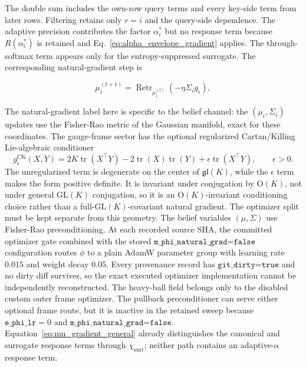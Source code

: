 \documentclass[twoside,11pt]{article}
\begin{document}
The double sum includes the own-row query terms and every key-side term from later rows. Filtering retains only $r=i$ and the query-side dependence. The adaptive precision contributes the factor $\alpha_i^*$ but no response term because $R(\alpha_i^*)$ is retained and Eq.~\eqref{eq:alpha_envelope_gradient} applies. The through-softmax term appears only for the entropy-suppressed surrogate. The corresponding natural-gradient step is

\begin{equation}
\boxed{
\mu_i^{(t+1)}
=\operatorname{Retr}_{\mu_i^{(t)}}
\left(-\eta\Sigma_i g_i\right),
}
\label{eq:natural_gradient_general}
\end{equation}

The natural-gradient label here is specific to the belief channel: the $(\mu_i, \Sigma_i)$ updates use the Fisher-Rao metric of the Gaussian manifold, exact for these coordinates. The gauge-frame sector has the optional regularized Cartan/Killing Lie-algebraic conditioner
\begin{equation}
g_{\epsilon}^{\mathrm{CK}}(X,Y)
=2K\operatorname{tr}(X^\top Y)-2\operatorname{tr}(X)\operatorname{tr}(Y)
+\epsilon\operatorname{tr}(X^\top Y),
\qquad \epsilon>0.
\label{eq:regularized_cartan_killing_preconditioner}
\end{equation}
The unregularized term is degenerate on the center of $\mathfrak{gl}(K)$, while the $\epsilon$ term makes the form positive definite. It is invariant under conjugation by $\mathrm{O}(K)$, not under general $\mathrm{GL}(K)$ conjugation, so it is an $\mathrm{O}(K)$-invariant conditioning choice rather than a full-$\mathrm{GL}(K)$-covariant natural gradient. The optimizer split must be kept separate from this geometry. The belief variables $(\mu,\Sigma)$ use Fisher-Rao preconditioning. At each recorded source SHA, the committed optimizer gate combined with the stored $\texttt{m\_phi\_natural\_grad=false}$ configuration routes $\phi$ to a plain AdamW parameter group with learning rate $0.015$ and weight decay $0.05$. Every provenance record has $\texttt{git\_dirty=true}$ and no dirty diff survives, so the exact executed optimizer implementation cannot be independently reconstructed. The heavy-ball field belongs only to the disabled custom outer frame optimizer. The pullback preconditioner can serve either optional frame route, but it is inactive in the retained sweep because $\texttt{e\_phi\_lr}=0$ and $\texttt{m\_phi\_natural\_grad=false}$. Equation~\eqref{eq:mu_gradient_general} already distinguishes the canonical and surrogate response terms through $\chi_{\mathrm{surr}}$; neither path contains an adaptive-$\alpha$ response term.
\end{document}
